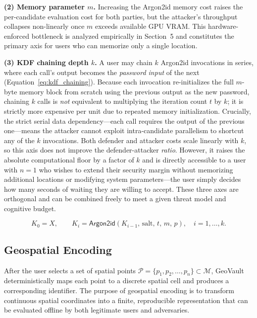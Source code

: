 \documentclass[journal,article,accept,pdftex,moreauthors]{Definitions/mdpi}
\begin{document}
\textbf{(2) Memory parameter $m$.} Increasing the Argon2id memory cost raises the per-candidate evaluation cost for both parties, but the attacker's throughput collapses non-linearly once $m$ exceeds available GPU VRAM. This hardware-enforced bottleneck is analyzed empirically in Section~5 and constitutes the primary axis for users who can memorize only a single location.

\textbf{(3) KDF chaining depth $k$.} A user may chain $k$ Argon2id invocations in series, where each call's output becomes the \emph{password input} of the next (Equation~\ref{eq:kdf_chaining}). Because each invocation re-initializes the full $m$-byte memory block from scratch using the previous output as the new password, chaining $k$ calls is \emph{not} equivalent to multiplying the iteration count $t$ by $k$; it is strictly more expensive per unit due to repeated memory initialization. Crucially, the strict serial data dependency---each call requires the output of the previous one---means the attacker cannot exploit intra-candidate parallelism to shortcut any of the $k$ invocations. Both defender and attacker costs scale linearly with $k$, so this axis does not improve the defender-attacker \emph{ratio}. However, it raises the absolute computational floor by a factor of $k$ and is directly accessible to a user with $n=1$ who wishes to extend their security margin without memorizing additional locations or modifying system parameters---the user simply decides how many seconds of waiting they are willing to accept. These three axes are orthogonal and can be combined freely to meet a given threat model and cognitive budget.

\begin{equation}
K_0 = X, \qquad K_i = \mathsf{Argon2id}(K_{i-1},\,\text{salt},\,t,\,m,\,p), \quad i = 1, \dots, k.
\label{eq:kdf_chaining}
\end{equation}


\subsection{Geospatial Encoding}
\label{sec:spatial_models}

After the user selects a set of spatial points $\mathcal{P} = \{p_1, p_2, \dots, p_n\} \subset \mathcal{M}$, GeoVault deterministically maps each point to a discrete spatial cell and produces a corresponding identifier. The purpose of geospatial encoding is to transform continuous spatial coordinates into a finite, reproducible representation that can be evaluated offline by both legitimate users and adversaries.
\end{document}
